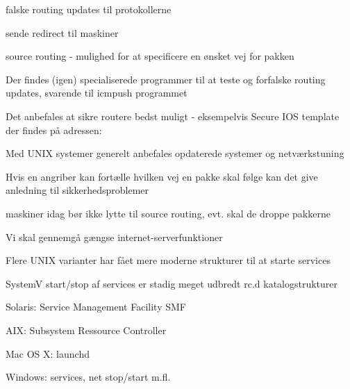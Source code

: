 
\begin{list1}
  \item falske routing updates til protokollerne
\item sende redirect til maskiner
\item source routing - mulighed for at specificere en ønsket vej for
  pakken 
\item Der findes (igen) specialiserede programmer til at teste og
  forfalske routing updates, svarende til icmpush programmet
\item Det anbefales at sikre routere bedst muligt - eksempelvis 
Secure IOS template der findes på adressen:\\
{\small {}}
\item Med UNIX systemer generelt anbefales opdaterede systemer og netværkstuning
\end{list1}



\begin{list1}
\item Hvis en angriber kan fortælle hvilken vej en pakke skal følge
  kan det give anledning til sikkerhedsproblemer
\item maskiner idag bør ikke lytte til source routing, evt. skal de
  droppe pakkerne
\end{list1}




\centerline{Vi skal gennemgå gængse internet-serverfunktioner}


\begin{list1}
\item Flere UNIX varianter har fået mere moderne strukturer til at
  starte services
\item SystemV start/stop af services er stadig meget udbredt rc.d
  katalogstrukturer 
\item Solaris: Service Management Facility SMF
\item AIX: Subsystem Ressource Controller  
\item Mac OS X: launchd
\item Windows: services, net stop/start m.fl.
\end{list1}



